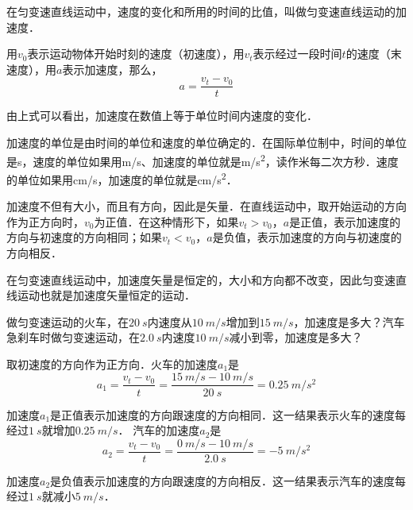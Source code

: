 在匀变速直线运动中，速度的变化和所用的时间的比值，叫做匀变速直线运动的加速度．

用$v_0$表示运动物体开始时刻的速度（初速度），用$v_t$表示经过一段时间$t$的速度（末速度），用$a$表示加速度，那么，
\begin{equation}
    a=\frac{v_t-v_0}{t}
\end{equation}

由上式可以看出，加速度在数值上等于单位时间内速度的变化．

加速度的单位是由时间的单位和速度的单位确定的．在国际单位制中，时间的单位是\si{s}，速度的单位如果用\si{m/s}、加速度的单位就是\si{m/s^2}，读作米每二次方秒．速度的单位如果用\si{cm/s}，加速度的单位就是\si{cm/s^2}．

加速度不但有大小，而且有方向，因此是矢量．在直线运动中，取开始运动的方向作为正方向时，$v_0$为正值．在这种情形下，如果$v_t>v_0$，$a$是正值，表示加速度的方向与初速度的方向相同；如果$v_t<v_0$，$a$是负值，表示加速度的方向与初速度的方向相反．

在匀变速直线运动中，加速度矢量是恒定的，大小和方向都不改变，因此匀变速直线运动也就是加速度矢量恒定的运动．

\begin{Example} 做匀变速运动的火车，在$\qty{20}{s}$内速度从$\qty{10}{m/s}$增加到$\qty{15}{m/s}$，加速度是多大？汽车急刹车时做匀变速运动，在$\qty{2.0}{s}$内速度$\qty{10}{m/s}$减小到零，加速度是多大？
\end{Example}


\begin{Answer}
取初速度的方向作为正方向．火车的加速度$a_1$是
\[a_1=\frac{v_t-v_0}{t}=\frac{\qty{15}{m/s}-\qty{10}{m/s}}{\qty{20}{s}}=\qty{0.25}{m/s^2} \]

加速度$a_1$是正值表示加速度的方向跟速度的方向相同．这一结果表示火车的速度每经过$\qty{1}{s}$就增加$\qty{0.25}{m/s}$．
汽车的加速度$a_2$是
\[a_2=\frac{v_t-v_0}{t}=\frac{\qty{0}{m/s}-\qty{10}{m/s}}{\qty{2.0}{s}}=\qty{-5}{m/s^2} \]

加速度$a_2$是负值表示加速度的方向跟速度的方向相反．这一结果表示汽车的速度每经过$\qty{1}{s}$就减小$\qty{5}{m/s}$．
\end{Answer}





